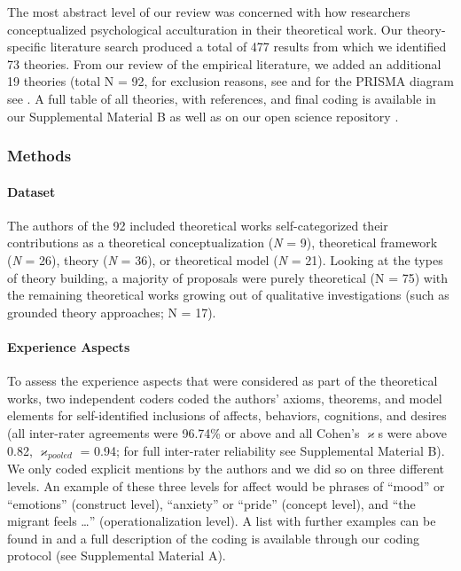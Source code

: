 The most abstract level of our review was concerned with how researchers
conceptualized psychological acculturation in their theoretical work.
Our theory-specific literature search produced a total of 477 results
from which we identified 73 theories. From our review of the empirical
literature, we added an additional 19 theories (total N = 92, for
exclusion reasons, see  and for the
PRISMA diagram see . A full table of all
theories, with references, and final coding is available in our
Supplemental Material B as well as on our open science repository
\citep[see][]{Kreienkamp2021d, Kreienkamp2021e}.



\subsubsection{Methods}
\paragraph{Dataset}

The authors of the 92 included theoretical works self-categorized their
contributions as a theoretical conceptualization (\textit{N} = 9),
theoretical framework (\textit{N} = 26), theory (\textit{N} = 36), or
theoretical model (\textit{N} = 21). Looking at the types of theory
building, a majority of proposals were purely theoretical (N = 75) with
the remaining theoretical works growing out of qualitative
investigations (such as grounded theory approaches; N = 17).

\paragraph{Experience Aspects}

To assess the experience aspects that were considered as part of the
theoretical works, two independent coders coded the authors' axioms,
theorems, and model elements for self-identified inclusions of affects,
behaviors, cognitions, and desires (all inter-rater agreements were
96.74\% or above and all Cohen's \(\varkappa\)s were above 0.82,
\(\varkappa_{pooled}\) = 0.94; for full inter-rater reliability see
Supplemental Material B). We only coded explicit mentions by the authors
and we did so on three different levels. An example of these three
levels for affect would be phrases of ``mood'' or ``emotions''
(construct level), ``anxiety'' or ``pride'' (concept level), and ``the
migrant feels \ldots{}'' (operationalization level). A list with further
examples can be found in  and a full
description of the coding is available through our coding protocol (see
Supplemental Material A).

